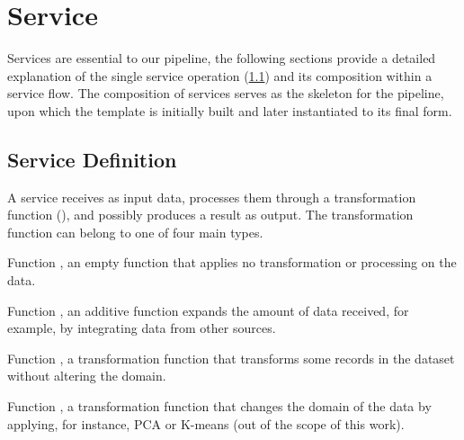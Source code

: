 \section{Service}
Services are essential to our pipeline, the following sections provide a detailed explanation of the single service operation (\cref{sec:service_definition})  and its composition within a service flow.
The composition of services serves as the skeleton for the pipeline, upon which the template is initially built and later instantiated to its final form.

\subsection{Service Definition}\label{sec:service_definition}
A service receives as input data, processes them through a transformation function (\F{}), and possibly produces a result as output.
The transformation function can belong to one of four main types.
\begin{enumerate*}[label=\roman*)]
  \item Function , an empty function that applies no transformation or processing on the data.
  \item Function , an additive function expands the amount of data received, for example, by integrating data from other sources.
  \item Function , a transformation function that transforms some records in the dataset without altering the domain.
  \item Function , a transformation function that changes the domain of the data by applying, for instance, PCA or K-means (out of the scope of this work).
\end{enumerate*}

